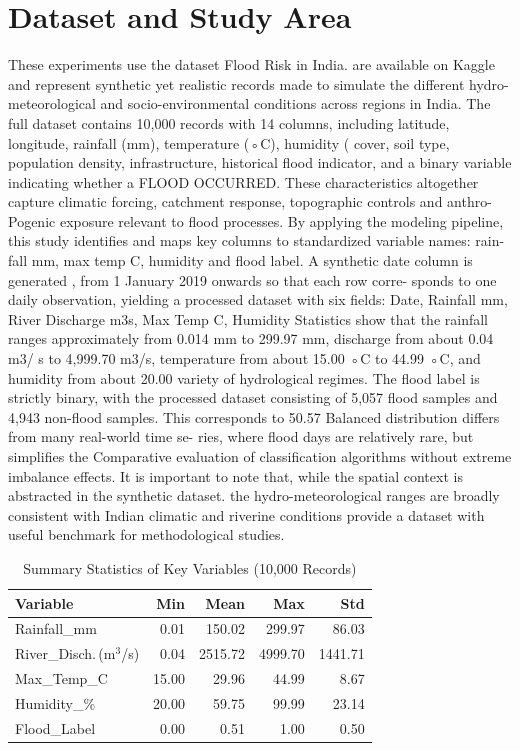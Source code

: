 \documentclass[conference]{IEEEtran}
\begin{document}
\section{Dataset and Study Area}
These experiments use the dataset Flood Risk in India.
are available on Kaggle and represent synthetic yet realistic
records made to simulate the different hydro-meteorological and
socio-environmental conditions across regions in India. The full
dataset contains 10,000 records with 14 columns, including
latitude, longitude, rainfall (mm), temperature (◦C), humidity
(%
cover, soil type, population density, infrastructure, historical
flood indicator, and a binary variable indicating whether a
FLOOD OCCURRED. These characteristics altogether capture climatic
forcing, catchment response, topographic controls and anthro-
Pogenic exposure relevant to flood processes.
By applying the modeling pipeline, this study identifies
and maps key columns to standardized variable names: rain-
fall mm, max temp C, humidity %
and flood label. A synthetic date column is generated
, from 1 January 2019 onwards so that each row corre-
sponds to one daily observation, yielding a processed dataset
with six fields: Date, Rainfall mm, River Discharge m3s,
Max Temp C, Humidity %
Statistics show that the rainfall ranges approximately from
0.014 mm to 299.97 mm, discharge from about 0.04 m3/ s to
4,999.70 m3/s, temperature from about 15.00 ◦C to 44.99 ◦C,
and humidity from about 20.00%
variety of hydrological regimes.
The flood label is strictly binary, with the processed dataset
consisting of 5,057 flood samples and 4,943 non-flood samples.
This corresponds to 50.57%
Balanced distribution differs from many real-world time se-
ries, where flood days are relatively rare, but simplifies the
Comparative evaluation of classification algorithms without
extreme imbalance effects. It is important to note that, while
the spatial context is abstracted in the synthetic dataset.
the hydro-meteorological ranges are broadly consistent with
Indian climatic and riverine conditions provide a dataset with
useful benchmark for methodological studies.
\begin{table}[htbp]
\caption{Summary Statistics of Key Variables (10{,}000 Records)}
\centering
\begin{tabular}{lrrrr}
\toprule
\textbf{Variable} & \textbf{Min} & \textbf{Mean} & \textbf{Max} & \textbf{Std} \\
\midrule
Rainfall\_mm & 0.01 & 150.02 & 299.97 & 86.03 \\
River\_Disch.\,(m\(^3\)/s) & 0.04 & 2515.72 & 4999.70 & 1441.71 \\
Max\_Temp\_C & 15.00 & 29.96 & 44.99 & 8.67 \\
Humidity\_\% & 20.00 & 59.75 & 99.99 & 23.14 \\
Flood\_Label & 0.00 & 0.51 & 1.00 & 0.50 \\
\bottomrule
\end{tabular}
\label{tab:stats}
\end{table}
\end{document}
